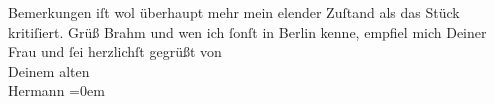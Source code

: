 \begin{ledgroupsized}[t]{13cm}
               Bemerkungen iſt wol überhaupt mehr mein elender Zuſtand als das Stück kritiſiert.\pend
           \pstart
           Grüß Brahm und wen ich ſonſt in Berlin kenne, empfiel mich Deiner Frau und ſei herzlichſt
               gegrüßt von{\\[\baselineskip]}Deinem alten{\\[\baselineskip]}\spacefill\mbox{Hermann}\pend
           \leftskip=0em{}
         
         \endnumbering{}\end{ledgroupsized}  \newcommand{\dateiname}{L01367}\newcommand{\titel}{Hermann Bahr an Arthur Schnitzler, 29. 1. 1904}\newcommand{\editorInnen}{ Kurt Ifkovits,  Martin Anton Müller}
      